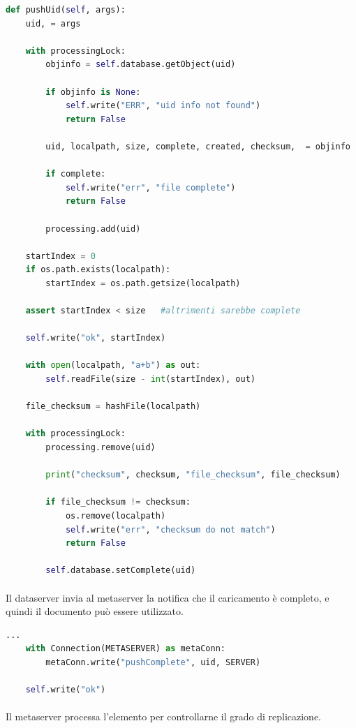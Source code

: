 \documentclass[11pt,a4paper,english]{article}
\begin{document}
\begin{lstlisting}[language=Python, title=Dataserver]
def pushUid(self, args):
    uid, = args

    with processingLock:
        objinfo = self.database.getObject(uid)

        if objinfo is None:
            self.write("ERR", "uid info not found")
            return False

        uid, localpath, size, complete, created, checksum,  = objinfo

        if complete:
            self.write("err", "file complete")
            return False

        processing.add(uid)

    startIndex = 0
    if os.path.exists(localpath):
        startIndex = os.path.getsize(localpath)

    assert startIndex < size   #altrimenti sarebbe complete

    self.write("ok", startIndex)

    with open(localpath, "a+b") as out:
        self.readFile(size - int(startIndex), out)

    file_checksum = hashFile(localpath)

    with processingLock:
        processing.remove(uid)

        print("checksum", checksum, "file_checksum", file_checksum)

        if file_checksum != checksum:
            os.remove(localpath)
            self.write("err", "checksum do not match")
            return False

        self.database.setComplete(uid)
\end{lstlisting}

\paragraph{} Il dataserver invia al metaserver la notifica che il caricamento è completo, e quindi il documento può essere utilizzato.

\begin{lstlisting}[language=Python, title=Dataserver]
    ...
    with Connection(METASERVER) as metaConn:
        metaConn.write("pushComplete", uid, SERVER)

    self.write("ok")
\end{lstlisting}

\paragraph{} Il metaserver processa l'elemento per controllarne il grado di replicazione.
\end{document}
